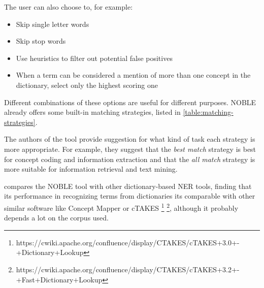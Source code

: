 The user can also choose to, for example:

\begin{itemize}
\item Skip single letter words
\item Skip stop words
\item Use heuristics to filter out potential false positives
\item When a term can be considered a mention of more than one concept in the dictionary,  select only the highest scoring one
\end{itemize}

Different combinations of these options are useful for different purposes. NOBLE already offers some built-in matching strategies, listed in \ref{table:matching-strategies}. 

\begin{table}[ht]
\centering
{}
\caption{NOBLE matching strategies present in the GUI interface. Adapted from \citep{Tseytlin2016}. This correspond to the options used in the GUI tool.}
\label{table:matching-strategies}
\end{table}

The authors of the tool provide suggestion for what kind of task each strategy is more appropriate. For example, they suggest that the \textit{best match} strategy is best for concept coding and information extraction and that the \textit{all match} strategy is more suitable for information retrieval and text mining.

\citep{Tseytlin2016} compares the NOBLE tool with other dictionary-based NER tools, finding that its performance in recognizing terms from dictionaries its comparable with other similar software like Concept Mapper \citep{Stewart} or cTAKES \footnote{https://cwiki.apache.org/confluence/display/CTAKES/cTAKES+3.0+-+Dictionary+Lookup} \footnote{https://cwiki.apache.org/confluence/display/CTAKES/cTAKES+3.2+-+Fast+Dictionary+Lookup}, although it probably depends a lot on the corpus used.

